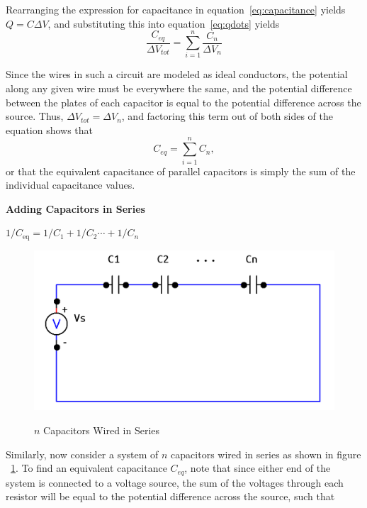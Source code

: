 \documentclass[twocolumn,english]{IEEEtran}
\theoremstyle{plain}
\theoremstyle{plain}
\begin{document}
  Rearranging the expression for capacitance in equation~\ref{eq:capacitance} yields $Q=C\Delta V$, and substituting this into equation~\ref{eq:qdots} yields
  \begin{equation*}
  \frac{C_{eq}}{\Delta V_{tot}} = \sum_{i=1}^{n} \frac{C_n}{\Delta V_n}
  \end{equation*}

  Since the wires in such a circuit are modeled as ideal conductors, the potential along any given wire must be everywhere the same, and the potential difference between the plates of each capacitor is equal to the potential difference across the source. Thus, $\Delta V_{tot} = \Delta V_n$, and factoring this term out of both sides of the equation shows that
  \begin{equation}
  C_{eq} = \sum_{i=1}^{n} C_n,
  \end{equation}
  or that the equivalent capacitance of parallel capacitors is simply the sum of the individual capacitance values.

  \noindent \hrulefill

\noindent \textbf{Adding Capacitors in Series}

\noindent$1/C_{\text{eq}}=1/C_1 + 1/C_2\cdots+1/C_n$

  \begin{figure}[h!]
  \begin{centering}
  \begin{center}
  \includegraphics[width=\linewidth]{./Pictures/seriesc.png}
  \label{fig:series_diagram}
  \caption{$n$ Capacitors Wired in Series}
  \end{center}
  \par\end{centering}
  \end{figure}

  Similarly, now consider a system of $n$ capacitors wired in series as shown in figure ~\ref{fig:series_diagram}. To find an equivalent capacitance $C_{eq}$, note that since either end of the system is connected to a voltage source, the sum of the voltages through each resistor will be equal to the potential difference across the source, such that
\end{document}
